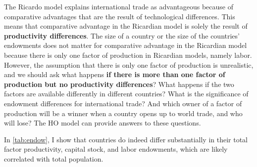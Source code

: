 {	The Ricardo model explains international trade as advantageous because of comparative advantages that are the result of technological differences. This means that comparative advantage in the Ricardian model is solely the result of \textbf{productivity differences}. The size of a country or the size of the countries' endowments does not matter for comparative advantage in the Ricardian model because there is only one factor of production in Ricardian models, namely labor. However, the assumption that there is only one factor of production is unrealistic, and we should ask what happens \textbf{if there is more than one factor of production but no productivity differences}? 
	What happens if the two factors are available differently in different countries? What is the significance of endowment differences for international trade? And which owner of a factor of production will be a winner when a country opens up to world trade, and who will lose? The HO model can provide answers to these questions. 
	
	In \autoref{tab:endow}, I show that countries do indeed differ substantially in their total factor productivity, capital stock, and labor endowments, which are likely correlated with total population. 
	
	\pbn
}
